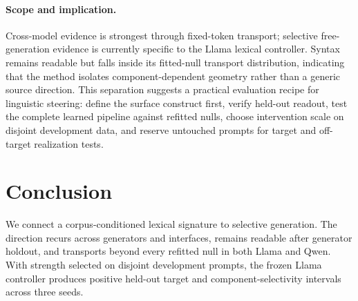\paragraph{Scope and implication.} Cross-model evidence is strongest through fixed-token transport; selective free-generation evidence is currently specific to the Llama lexical controller. Syntax remains readable but falls inside its fitted-null transport distribution, indicating that the method isolates component-dependent geometry rather than a generic source direction. This separation suggests a practical evaluation recipe for linguistic steering: define the surface construct first, verify held-out readout, test the complete learned pipeline against refitted nulls, choose intervention scale on disjoint development data, and reserve untouched prompts for target and off-target realization tests.

\section{Conclusion}

We connect a corpus-conditioned lexical signature to selective generation. The direction recurs across generators and interfaces, remains readable after generator holdout, and transports beyond every refitted null in both Llama and Qwen. With strength selected on disjoint development prompts, the frozen Llama controller produces positive held-out target and component-selectivity intervals across three seeds.
